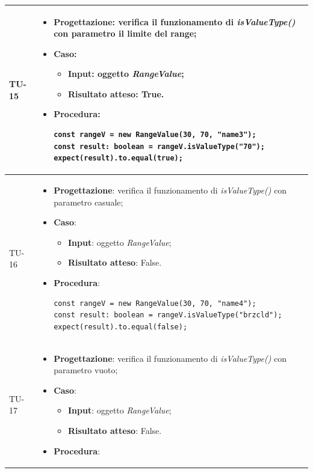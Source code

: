 \begin{longtable}{|C{1.5cm}|C{14.5cm}|}
	\hline
	{TU-15} &  
	\begin{itemize}
		\item \textbf{Progettazione}: verifica il funzionamento di \emph{isValueType()} con parametro il limite del range;
		\item \textbf{Caso}: 
		\begin{itemize}
			\item \textbf{Input}: oggetto \emph{RangeValue};
			\item \textbf{Risultato atteso}: True.
		\end{itemize}
		\item \textbf{Procedura}:
		\begin{lstlisting}
const rangeV = new RangeValue(30, 70, "name3");
const result: boolean = rangeV.isValueType("70");
expect(result).to.equal(true);		
		\end{lstlisting}
	\end{itemize}\\
	\hline
	{TU-16} &  
	\begin{itemize}
	\item \textbf{Progettazione}: verifica il funzionamento di \emph{isValueType()} con parametro casuale;
	\item \textbf{Caso}: 
	\begin{itemize}
		\item \textbf{Input}: oggetto \emph{RangeValue};
		\item \textbf{Risultato atteso}: False.
	\end{itemize}
	\item \textbf{Procedura}:
	\begin{lstlisting}
const rangeV = new RangeValue(30, 70, "name4");
const result: boolean = rangeV.isValueType("brzcld");
expect(result).to.equal(false);	
	\end{lstlisting}
	\end{itemize}\\
	\hline
	{TU-17} &  
		\begin{itemize}
			\item \textbf{Progettazione}: verifica il funzionamento di \emph{isValueType()} con parametro vuoto;
			\item \textbf{Caso}: 
			\begin{itemize}
				\item \textbf{Input}: oggetto \emph{RangeValue};
				\item \textbf{Risultato atteso}: False.
			\end{itemize}
			\item \textbf{Procedura}:

\end{itemize}
\end{longtable}
